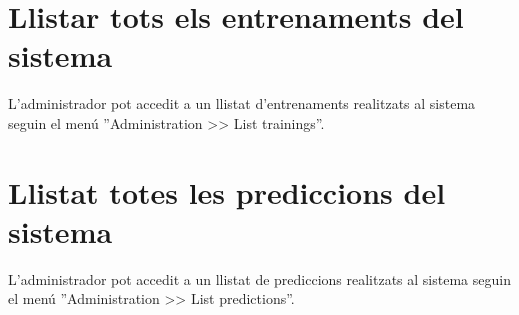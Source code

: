 \section{Llistar tots els entrenaments del sistema}
L'administrador pot accedit a  un llistat d'entrenaments realitzats al sistema seguin el menú ''Administration >> List trainings''.

\section{Llistat totes les prediccions del sistema}
L'administrador pot accedit a  un llistat de prediccions realitzats al sistema seguin el menú ''Administration >> List predictions''.

